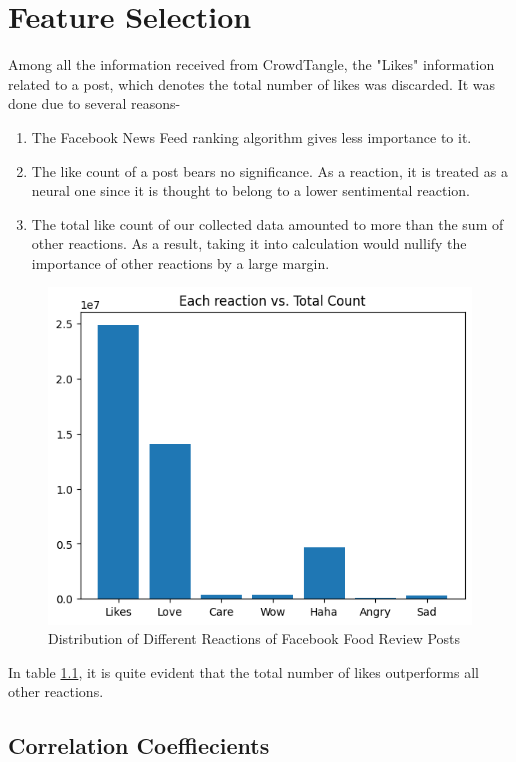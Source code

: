 \chapter{Feature Selection}\label{feature_selection}

Among all the information received from CrowdTangle, the "Likes" information related to a post, which denotes the total number of likes was discarded. It was done due to several reasons- 

\begin{enumerate}
    \item {The Facebook News Feed ranking algorithm gives less importance to it.}\cite{fbnews}
    \item {The like count of a post bears no significance. As a reaction, it is treated as a neural one since it is thought to belong to a lower sentimental reaction.}
    \item {The total like count of our collected data amounted to more than the sum of other reactions. As a result, taking it into calculation would nullify the importance of other reactions by a large margin.}
\end{enumerate}

\begin{figure}[H]
    \begin{center}
        \includegraphics[height=0.5\linewidth]{figures/reaction_distribution.png}
        \caption{Distribution of Different Reactions of Facebook Food Review Posts}
        \label{reaction_count}            
    \end{center}
\end{figure}

In table \ref{reaction_count}, it is quite evident that the total number of likes outperforms all other reactions.

\section{Correlation Coeffiecients}

